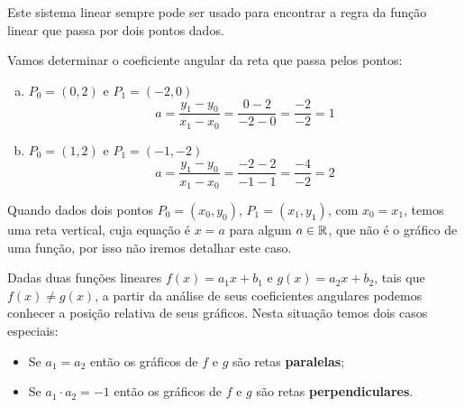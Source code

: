   Este sistema linear sempre pode ser usado para encontrar a regra da função linear que passa por dois pontos dados.


  \begin{exem}
  Vamos determinar o coeficiente angular da reta que passa pelos pontos:
   \begin{enumerate}[a)]
    \item $P_0=(0,2)$ e $P_1=(-2,0)$
\begin{equation*}
a= \frac{y_1 - y_0}{x_1 - x_0}= \frac{0 - 2}{-2 - 0}= \frac{-2}{-2}= 1
\end{equation*}
    \item $P_0=(1,2)$ e $P_1=(-1,-2)$
\begin{equation*}
a= \frac{y_1 - y_0}{x_1 - x_0}= \frac{-2 - 2}{-1 - 1}= \frac{-4}{-2}= 2
\end{equation*}
   \end{enumerate}

  \end{exem}

  Quando dados dois pontos $P_0=(x_0, y_0)$, $P_1=(x_1, y_1)$, com $x_0 = x_1$, temos uma reta vertical, cuja equação é $x= a$ para algum $a \in \mathbb{R}$, que não é o gráfico de uma função, por isso não iremos detalhar este caso.

  Dadas duas funções lineares $f(x)=a_1 x + b_1$ e $g(x)= a_2 x + b_2$, tais que $f(x) \neq g(x)$, a partir da análise de seus coeficientes angulares podemos conhecer a posição relativa de seus gráficos. Nesta situação temos dois casos especiais:
  \begin{itemize}
  \item Se $a_1= a_2$ então os gráficos de $f$ e $g$ são retas \textbf{paralelas};
  \item Se $a_1 \cdot a_2= -1$ então os gráficos de $f$ e $g$ são retas \textbf{perpendiculares}.
  \end{itemize}

